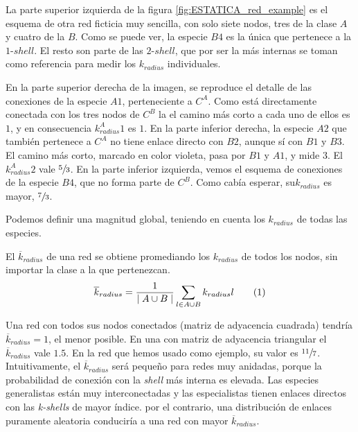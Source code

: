 La parte superior izquierda de la figura \ref{fig:ESTATICA_red_example} es el esquema de otra red ficticia muy sencilla, con solo siete nodos, tres de la clase $A$ y cuatro de la $B$. Como se puede ver,  la especie $B4$ es la única que pertenece a la $1$-$shell$. El resto son parte de las $2$-$shell$, que por ser la más internas se toman como referencia para medir los $k_{radius}$ individuales. 

En la parte superior derecha de la imagen, se reproduce el detalle de las conexiones de la especie $A1$, perteneciente a $C^{A}$.  Como está directamente conectada con los tres nodos de $C^{B}$ la el camino más corto a cada uno de ellos es $1$, y en consecuencia $k^A_{radius}1$ es $1$. En la parte inferior derecha, la especie $A2$ que también pertenece a $C^{A}$ no tiene enlace directo con $B2$, aunque sí con $B1$ y $B3$. El camino más corto, marcado en color violeta, pasa por $B1$ y $A1$, y mide $3$. El $k^A_{radius}2$ vale $\sfrac{5}{3}$. En la parte inferior izquierda, vemos el esquema de conexiones de la especie $B4$, que no forma parte de $C^{B}$. Como cabía esperar, su$k_{radius}$ es mayor, $\sfrac{7}{3}$. 

Podemos definir una magnitud global, teniendo en cuenta los $k_{radius}$ de todas las especies.

\clearpage
\begin{theo} 
El \textit{$\overline k_{radius}$} de una red se obtiene promediando los ${k}_{radius}$ de todos los nodos, sin importar la clase a la que pertenezcan.
\begin{align*}
\displaystyle
\overline {k}_{radius} = \frac{1}{\mid A \cup B \mid}\sum\limits_{l \in A \cup B} k_{radius}l
\stepcounter{equation}\tag{\theequation}\label{avgkradius}
\end{align*}
\label{ESTATICA_avgkradius}
\end{theo}

Una red con todos sus nodos conectados (matriz de adyacencia cuadrada) tendría $\overline {k}_{radius}=1$, el menor posible. En una con matriz de adyacencia triangular el $\overline {k}_{radius}$ vale $1.5$. En la red que hemos usado como ejemplo, su valor es $\sfrac{11}{7}$. Intuitivamente, el $\overline {k}_{radius}$ será pequeño para redes muy anidadas, porque la probabilidad de conexión con la \textit{shell} más interna es elevada. Las especies generalistas están muy interconectadas y las especialistas tienen enlaces directos con las \textit{k-shells} de mayor índice. por el contrario, una distribución de enlaces puramente aleatoria conduciría a una red con mayor $\overline {k}_{radius}$.

